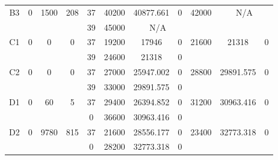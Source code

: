 \begin{sidewaystable}
\begin{tabular}{c||c|c|c||c|c|c|c||c|c|c}
         &
        
      \\
      \hline
      \multirow{2}{*}{B3} &
      \multirow{2}{*}{0} &
      \multirow{2}{*}{1500} &
      \multirow{2}{*}{208} &
      37 &
      40200 &
        40877.661 &
        0 &
      \multirow{2}{*}{42000} &
        \multicolumn{2}{c}{\multirow{2}{*}{N/A}}
      \\
      \cline{5-8}
       &
       &
       &
       &
      39 &
      45000 &
        \multicolumn{2}{|c||}{N/A} &
      
        
      \\
      \hline
      \multirow{2}{*}{C1} &
      \multirow{2}{*}{0} &
      \multirow{2}{*}{0} &
      \multirow{2}{*}{0} &
      37 &
      19200 &
        17946 &
        0 &
      \multirow{2}{*}{21600} &
        \multirow{2}{*}{21318} &
        \multirow{2}{*}{0}
      \\
      \cline{5-8}
       &
       &
       &
       &
      39 &
      24600 &
        21318 &
        0 &
      
         &
        
      \\
      \hline
      \multirow{2}{*}{C2} &
      \multirow{2}{*}{0} &
      \multirow{2}{*}{0} &
      \multirow{2}{*}{0} &
      37 &
      27000 &
        25947.002 &
        0 &
      \multirow{2}{*}{28800} &
        \multirow{2}{*}{29891.575} &
        \multirow{2}{*}{0}
      \\
      \cline{5-8}
       &
       &
       &
       &
      39 &
      33000 &
        29891.575 &
        0 &
      
         &
        
      \\
      \hline
      \multirow{2}{*}{D1} &
      \multirow{2}{*}{0} &
      \multirow{2}{*}{60} &
      \multirow{2}{*}{5} &
      37 &
      29400 &
        26394.852 &
        0 &
      \multirow{2}{*}{31200} &
        \multirow{2}{*}{30963.416} &
        \multirow{2}{*}{0}
      \\
      \cline{5-8}
       &
       &
       &
       &
      0 &
      36600 &
        30963.416 &
        0 &
      
         &
        
      \\
      \hline
      \multirow{2}{*}{D2} &
      \multirow{2}{*}{0} &
      \multirow{2}{*}{9780} &
      \multirow{2}{*}{815} &
      37 &
      21600 &
        28556.177 &
        0 &
      \multirow{2}{*}{23400} &
        \multirow{2}{*}{32773.318} &
        \multirow{2}{*}{0}
      \\
      \cline{5-8}
       &
       &
       &
       &
      0 &
      28200 &
        32773.318 &
        0 &
      

\end{tabular}
\end{sidewaystable}
